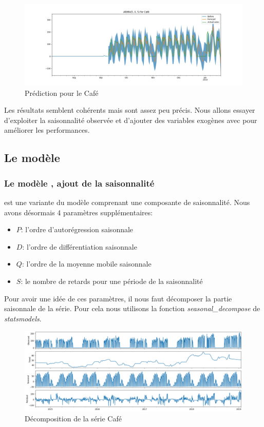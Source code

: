 \begin{figure}[ht]
    \centering
    \includegraphics[width=\textwidth]{figures/pred_arima_cafe.jpg}
    \caption{Prédiction \ARIMA pour le Café}
    \label{fig:pred_arima_cafe}
\end{figure}

Les résultats semblent cohérents mais sont assez peu précis. Nous allons essayer d'exploiter la saisonnalité observée et d'ajouter des variables exogènes avec \SARIMAX pour améliorer les performances.


\subsection{Le modèle \SARIMAX}
\label{sec:sarimax}


\subsubsection{Le modèle \SARIMA, ajout de la saisonnalité}
\label{subsec:sarima}

\SARIMA est une variante du modèle \ARIMA comprenant une composante de saisonnalité. Nous avons désormais 4 paramètres supplémentaires:
\begin{itemize}[nolistsep]
    \item $P$: l'ordre d'autorégression saisonnale
    \item $D$: l'ordre de différentiation saisonnale
    \item $Q$: l'ordre de la moyenne mobile saisonnale
    \item $S$: le nombre de retards pour une période de la saisonnalité
\end{itemize}

Pour avoir une idée de ces paramètres, il nous faut décomposer la partie saisonnale de la série. Pour cela nous utilisons la fonction \emph{seasonal\_decompose} de \emph{statsmodels}.

\begin{figure}[ht]
	\centering
	\includegraphics[width=\textwidth]{figures/seasonal_decompose_cafe.png}
	\caption{Décomposition de la série Café}
    \label{fig:seasonal_decompose_cafe}
\end{figure}

